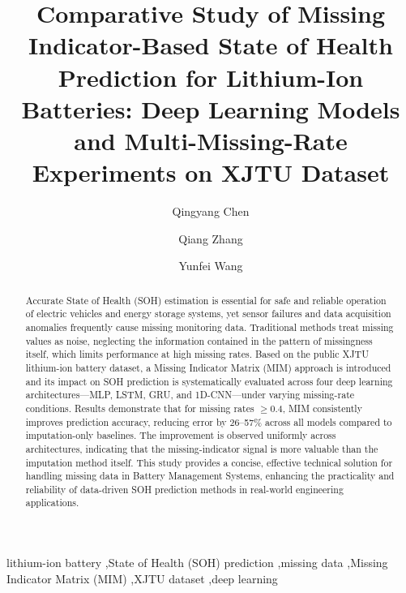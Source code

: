 \documentclass[5p,times]{elsarticle}
\begin{document}
\begin{frontmatter}

\title{Comparative Study of Missing Indicator-Based State of Health Prediction for Lithium-Ion Batteries: Deep Learning Models and Multi-Missing-Rate Experiments on XJTU Dataset}

\author[inst1]{Qingyang Chen}
\author[inst1]{Qiang Zhang}
\author[inst2]{Yunfei Wang}

\address[inst1]{School of Nuclear Science and Energy Engineering, Shandong University, Jinan 250061, China}
\address[inst2]{Shandong Supermaly Generating Equipment Co., Ltd, No.5153 Yingqian Street, Hi-technology Development Zone, Weifang 261061, Shandong, China}

\begin{abstract}
Accurate State of Health (SOH) estimation is essential for safe and reliable operation of electric vehicles and energy storage systems, yet sensor failures and data acquisition anomalies frequently cause missing monitoring data. Traditional methods treat missing values as noise, neglecting the information contained in the pattern of missingness itself, which limits performance at high missing rates. Based on the public XJTU lithium-ion battery dataset, a Missing Indicator Matrix (MIM) approach is introduced and its impact on SOH prediction is systematically evaluated across four deep learning architectures---MLP, LSTM, GRU, and 1D-CNN---under varying missing-rate conditions. Results demonstrate that for missing rates $\geq$0.4, MIM consistently improves prediction accuracy, reducing error by 26--57\% across all models compared to imputation-only baselines. The improvement is observed uniformly across architectures, indicating that the missing-indicator signal is more valuable than the imputation method itself. This study provides a concise, effective technical solution for handling missing data in Battery Management Systems, enhancing the practicality and reliability of data-driven SOH prediction methods in real-world engineering applications.
\end{abstract}

\begin{keyword}
lithium-ion battery \sep State of Health (SOH) prediction \sep missing data \sep Missing Indicator Matrix (MIM) \sep XJTU dataset \sep deep learning
\end{keyword}

\end{frontmatter}
\end{document}
